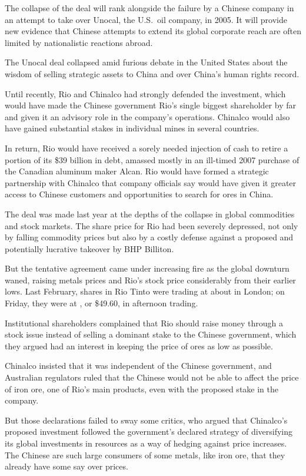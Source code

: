 \documentclass[12pt,a4paper,onecolumn]{article}
\begin{document}
The collapse of the deal will rank alongside the failure by a Chinese company in an attempt to take
over Unocal, the U.S.~oil company, in 2005. It will provide new evidence that Chinese attempts to
extend its global corporate reach are often limited by nationalistic reactions abroad.

The Unocal deal collapsed amid furious debate in the United States about the wisdom of selling
strategic assets to China and over China's human rights record.

Until recently, Rio and Chinalco had strongly defended the investment, which would have made the
Chinese government Rio's single biggest shareholder by far and given it an advisory role in the
company's operations. Chinalco would also have gained substantial stakes in individual mines in
several countries.

In return, Rio would have received a sorely needed injection of cash to retire a portion of its \$39
billion in debt, amassed mostly in an ill-timed 2007 purchase of the Canadian aluminum maker Alcan.
Rio would have formed a strategic partnership with Chinalco that company officials say would have
given it greater access to Chinese customers and opportunities to search for ores in China.

The deal was made last year at the depths of the collapse in global commodities and stock markets.
The share price for Rio had been severely depressed, not only by falling commodity prices but also
by a costly defense against a proposed and potentially lucrative takeover by BHP Billiton.

But the tentative agreement came under increasing fire as the global downturn waned, raising metals
prices and Rio's stock price considerably from their earlier lows. Last February, shares in Rio
Tinto were trading at about  in London; on Friday, they were at ,
or \$49.60, in afternoon trading.

Institutional shareholders complained that Rio should raise money through a stock issue instead of
selling a dominant stake to the Chinese government, which they argued had an interest in keeping the
price of ores as low as possible.

Chinalco insisted that it was independent of the Chinese government, and Australian regulators ruled
that the Chinese would not be able to affect the price of iron ore, one of Rio's main products, even
with the proposed stake in the company.

But those declarations failed to sway some critics, who argued that Chinalco's proposed investment
followed the government's declared strategy of diversifying its global investments in resources as a
way of hedging against price increases. The Chinese are such large consumers of some metals, like
iron ore, that they already have some say over prices.
\end{document}
